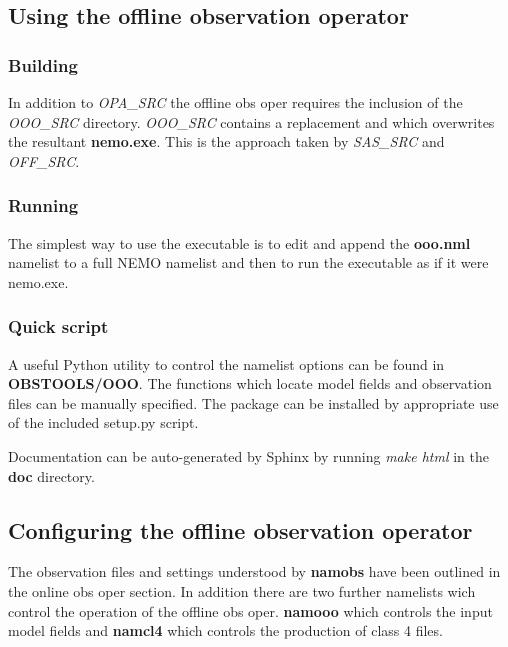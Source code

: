 \documentclass[../tex_main/NEMO_manual]{subfiles}
\begin{document}
\subsection{Using the offline observation operator}

\subsubsection{Building}

In addition to \emph{OPA\_SRC} the offline obs oper requires the inclusion
of the \emph{OOO\_SRC} directory. \emph{OOO\_SRC} contains a replacement  and
 which overwrites the resultant \textbf{nemo.exe}. This is the approach taken
by \emph{SAS\_SRC} and \emph{OFF\_SRC}.

\subsubsection{Running}

The simplest way to use the executable is to edit and append the \textbf{ooo.nml} namelist to
a full NEMO namelist and then to run the executable as if it were nemo.exe. 

\subsubsection{Quick script}

A useful Python utility to control the namelist options can be found in \textbf{OBSTOOLS/OOO}. The
functions which locate model fields and observation files can be manually specified. The package
can be installed by appropriate use of the included setup.py script.

Documentation can be auto-generated by Sphinx by running \emph{make html} in the \textbf{doc} directory.

\subsection{Configuring the offline observation operator}
The observation files and settings understood by \textbf{namobs} have been outlined in the online
obs oper section. In addition there are two further namelists wich control the operation of the offline
obs oper. \textbf{namooo} which controls the input model fields and \textbf{namcl4} which controls the
production of class 4 files. 
\end{document}
